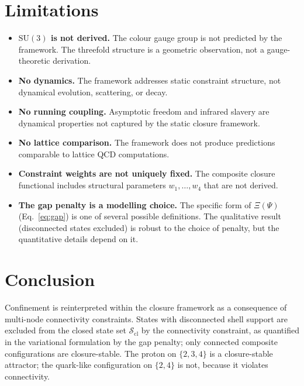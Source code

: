 \documentclass[12pt]{article}
\newcommand{\Scl}{\mathcal{S}_{\mathrm{cl}}}
\begin{document}
\section{Limitations}\label{sec:limits}

\begin{itemize}
    \item \textbf{$\mathrm{SU}(3)$ is not derived.} The colour gauge group is not predicted by the framework. The threefold structure is a geometric observation, not a gauge-theoretic derivation.
    \item \textbf{No dynamics.} The framework addresses static constraint structure, not dynamical evolution, scattering, or decay.
    \item \textbf{No running coupling.} Asymptotic freedom and infrared slavery are dynamical properties not captured by the static closure framework.
    \item \textbf{No lattice comparison.} The framework does not produce predictions comparable to lattice QCD computations.
    \item \textbf{Constraint weights are not uniquely fixed.} The composite closure functional includes structural parameters $w_1, \ldots, w_4$ that are not derived.
    \item \textbf{The gap penalty is a modelling choice.} The specific form of $\Xi(\Psi)$ (Eq.~\ref{eq:gap}) is one of several possible definitions. The qualitative result (disconnected states excluded) is robust to the choice of penalty, but the quantitative details depend on it.
\end{itemize}

\section{Conclusion}\label{sec:conclusion}

Confinement is reinterpreted within the closure framework as a consequence of multi-node connectivity constraints. States with disconnected shell support are excluded from the closed state set $\Scl$ by the connectivity constraint, as quantified in the variational formulation by the gap penalty; only connected composite configurations are closure-stable. The proton on $\{2,3,4\}$ is a closure-stable attractor; the quark-like configuration on $\{2,4\}$ is not, because it violates connectivity.
\end{document}
